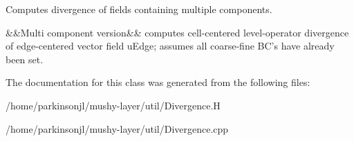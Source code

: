 Computes divergence of fields containing multiple components. 

\&\&Multi component version\&\& computes cell-\/centered level-\/operator divergence of edge-\/centered vector field u\-Edge; assumes all coarse-\/fine B\-C's have already been set. 

The documentation for this class was generated from the following files\-:\begin{DoxyCompactItemize}
\item 
/home/parkinsonjl/mushy-\/layer/util/Divergence.\-H\item 
/home/parkinsonjl/mushy-\/layer/util/Divergence.\-cpp\end{DoxyCompactItemize}
